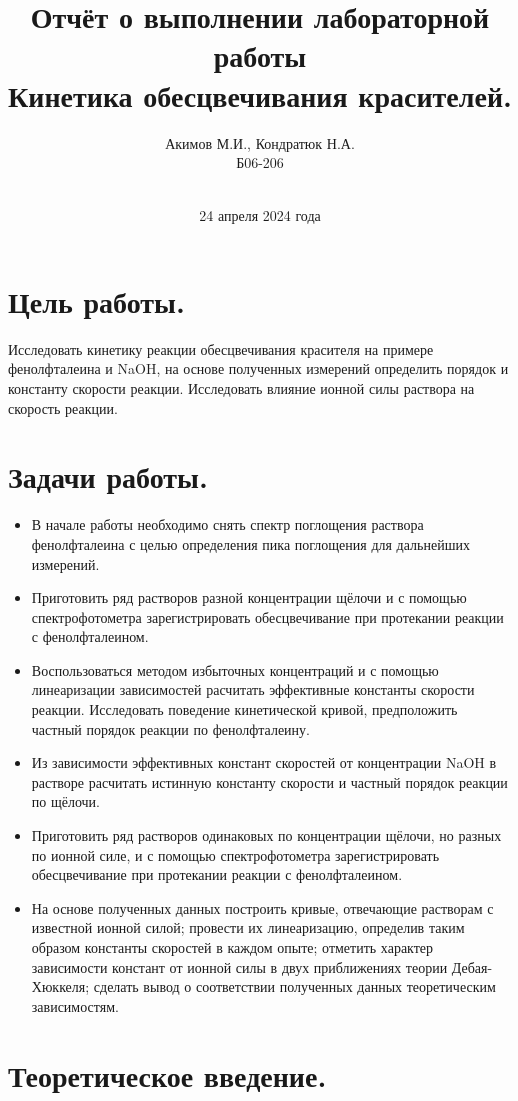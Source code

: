 \documentclass[a4paper, 11pt]{article}%
\author{Акимов М.И., Кондратюк Н.А. \\ Б06-206}
\title{Отчёт о выполнении лабораторной работы  \\ \textbf{Кинетика обесцвечивания красителей.}}
\date{\\24 апреля 2024 года}
\begin{document}
\maketitle
\section{Цель работы.}
    \par Исследовать кинетику реакции обесцвечивания красителя на примере фенолфталеина и NaOH, на основе полученных измерений определить порядок и константу скорости реакции. Исследовать влияние ионной силы раствора на скорость реакции.
\section{Задачи работы.}
    \begin{itemize}
        \item В начале работы необходимо снять спектр поглощения раствора фенолфталеина с целью определения пика поглощения для дальнейших измерений.
        \item Приготовить ряд растворов разной концентрации щёлочи и с помощью спектрофотометра зарегистрировать обесцвечивание при протекании реакции с фенолфталеином.
        \item Воспользоваться методом избыточных концентраций и с помощью линеаризации зависимостей расчитать эффективные константы скорости реакции. Исследовать поведение кинетической кривой, предположить частный порядок реакции по фенолфталеину.
        \item Из зависимости эффективных констант скоростей от концентрации NaOH в растворе расчитать истинную константу скорости и частный порядок реакции по щёлочи.
        \item Приготовить ряд растворов одинаковых по концентрации щёлочи, но разных по ионной силе, и с помощью спектрофотометра зарегистрировать обесцвечивание при протекании реакции с фенолфталеином.
        \item На основе полученных данных построить кривые, отвечающие растворам с известной ионной силой; провести их линеаризацию, определив таким образом константы скоростей в каждом опыте; отметить характер зависимости констант от ионной силы в двух приближениях теории Дебая-Хюккеля; сделать вывод о соответствии полученных данных теоретическим зависимостям.
        
    \end{itemize}

\section{Теоретическое введение.}
\end{document}
